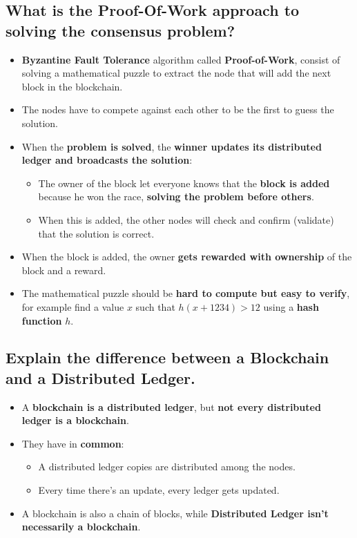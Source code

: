 \documentclass[9pt, letterpaper]{article}
\begin{document}
\subsection{What is the Proof-Of-Work approach to solving the consensus problem?}
\begin{itemize}
	\item \textbf{Byzantine Fault Tolerance} algorithm called \textbf{Proof-of-Work}, consist of solving a mathematical puzzle to extract the node that will add the next block in the blockchain.
	\item The nodes have to compete against each other to be the first to guess the solution.
	\item When the \textbf{problem is solved}, the \textbf{winner updates its distributed ledger and broadcasts the solution}: 
	\begin{itemize}
		\item The owner of the block let everyone knows that the \textbf{block is added} because he won the race, \textbf{solving the problem before others}.
		\item When this is added, the other nodes will check and confirm (validate) that the solution is correct.
\end{itemize}	 
	\item When the block is added, the owner \textbf{gets rewarded with ownership} of the block and a reward.
	\item The mathematical puzzle should be \textbf{hard to compute but easy to verify}, for example find a value $x$ such that $h(x+1234) > 12$ using a \textbf{hash function} $h$.
\end{itemize}

\subsection{Explain the difference between a Blockchain and a Distributed Ledger.}
\begin{itemize}
	\item A \textbf{blockchain is a distributed ledger}, but \textbf{not every distributed ledger is a blockchain}.
	\item They have in \textbf{common}:
	\begin{itemize}
		\item A distributed ledger copies are distributed among the nodes.
		\item Every time there's an update, every ledger gets updated.
	\end{itemize}
	\item A blockchain is also a chain of blocks, while \textbf{Distributed Ledger isn't necessarily a blockchain}.
\end{itemize}
\end{document}
